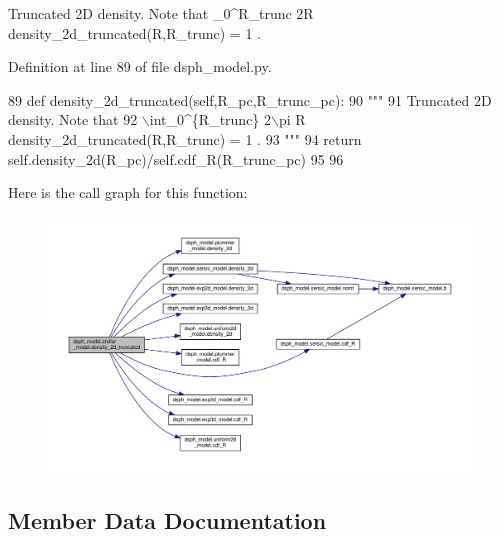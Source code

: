 \begin{DoxyVerb}Truncated 2D density. Note that
    \int_0^{R_trunc} 2\pi R density_2d_truncated(R,R_trunc) = 1 .
\end{DoxyVerb}
 

Definition at line 89 of file dsph\+\_\+model.\+py.


\begin{DoxyCode}
89     \textcolor{keyword}{def }density\_2d\_truncated(self,R\_pc,R\_trunc\_pc):
90         \textcolor{stringliteral}{"""}
91 \textcolor{stringliteral}{        Truncated 2D density. Note that}
92 \textcolor{stringliteral}{            \(\backslash\)int\_0^\{R\_trunc\} 2\(\backslash\)pi R density\_2d\_truncated(R,R\_trunc) = 1 .}
93 \textcolor{stringliteral}{        """}
94         \textcolor{keywordflow}{return} self.density\_2d(R\_pc)/self.cdf\_R(R\_trunc\_pc)
95 
96 
\end{DoxyCode}
Here is the call graph for this function\+:\nopagebreak
\begin{figure}[H]
\begin{center}
\leavevmode
\includegraphics[width=350pt]{d0/db5/classdsph__model_1_1stellar__model_acde2267ff0b15d0177b5eef57fd006ed_cgraph}
\end{center}
\end{figure}


\subsection{Member Data Documentation}
\mbox{\label{classdsph__model_1_1stellar__model_a96f64415fa962d0eda886a7ec575b2b3}} 
